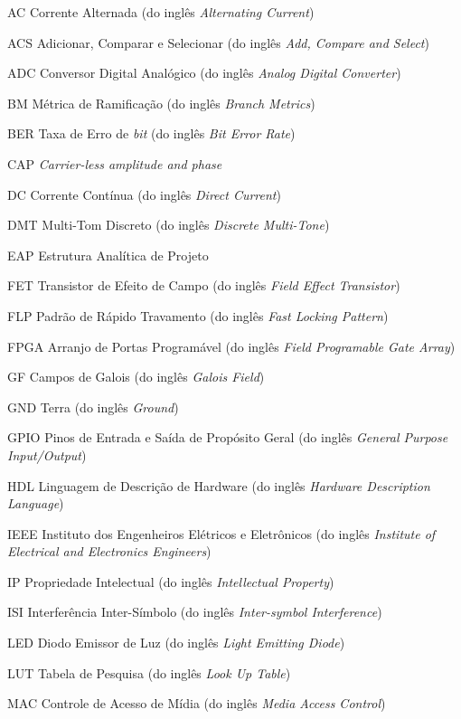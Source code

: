 \documentclass[
	12pt,				%
	openright,			%
	oneside,			%
	a4paper,			%
	hyphens,			%
	english,			%
	brazil				%
]{abntex2}
\begin{document}
	\begin{siglas}
		\item[AC] Corrente Alternada (do inglês \emph{Alternating Current})
		\item[ACS] Adicionar, Comparar e Selecionar (do inglês \emph{Add, Compare and Select})
		\item[ADC] Conversor Digital Analógico (do inglês \emph{Analog Digital Converter})
		\item[BM] Métrica de Ramificação (do inglês \emph{Branch Metrics})
		\item[BER] Taxa de Erro de \textit{bit} (do inglês \emph{Bit Error Rate})
		\item[CAP] \emph{Carrier-less amplitude and phase}
		\item[DC] Corrente Contínua (do inglês \emph{Direct Current})
		\item[DMT] Multi-Tom Discreto (do inglês \emph{Discrete Multi-Tone})
		\item[EAP] Estrutura Analítica de Projeto
		\item[FET] Transistor de Efeito de Campo (do inglês \emph{Field Effect Transistor})
		\item[FLP] Padrão de Rápido Travamento (do inglês \emph{Fast Locking Pattern})
		\item[FPGA] Arranjo de Portas Programável (do inglês \emph{Field Programable Gate Array})
		\item[GF] Campos de Galois (do inglês \emph{Galois Field})
		\item[GND] Terra (do inglês \emph{Ground})
		\item[GPIO] Pinos de Entrada e Saída de Propósito Geral (do inglês \emph{General Purpose Input/Output})
		\item[HDL] Linguagem de Descrição de Hardware (do inglês \emph{Hardware Description Language})
		\item[IEEE] Instituto dos Engenheiros Elétricos e Eletrônicos (do inglês \emph{Institute of Electrical and Electronics Engineers})
		\item[IP] Propriedade Intelectual (do inglês \emph{Intellectual Property})
		\item[ISI] Interferência Inter-Símbolo (do inglês \emph{Inter-symbol Interference})
		\item[LED] Diodo Emissor de Luz (do inglês \emph{Light Emitting Diode})
		\item[LUT] Tabela de Pesquisa (do inglês \emph{Look Up Table})
		\item[MAC] Controle de Acesso de Mídia (do inglês \emph{Media Access Control})

\end{siglas}
\end{document}
